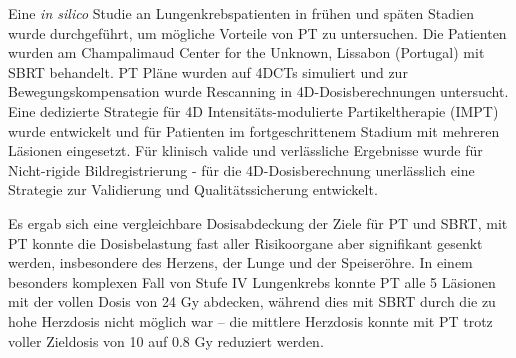 Eine \textit{in silico} Studie an Lungenkrebspatienten in fr\"{u}hen und sp\"{a}ten Stadien wurde durchgef\"{u}hrt, 
um m\"{o}gliche Vorteile von PT zu untersuchen. Die Patienten wurden am Champalimaud Center for the 
Unknown, Lissabon (Portugal) mit SBRT behandelt. PT Pl\"{a}ne wurden auf 4DCTs simuliert und zur 
Bewegungskompensation wurde Rescanning in 4D-Dosisberechnungen untersucht. Eine dedizierte Strategie 
f\"{u}r 4D Intensit\"{a}ts-modulierte Partikeltherapie (IMPT) wurde entwickelt und f\"{u}r Patienten im fortgeschrittenem 
Stadium mit mehreren L\"{a}sionen eingesetzt. F\"{u}r klinisch valide und verl\"{a}ssliche Ergebnisse wurde f\"{u}r Nicht-rigide
Bildregistrierung - f\"{u}r die 4D-Dosisberechnung unerl\"{a}sslich eine Strategie zur Validierung und Qualit\"{a}tssicherung entwickelt.

Es ergab sich eine vergleichbare Dosisabdeckung der Ziele f\"{u}r PT und SBRT, mit PT konnte die 
Dosisbelastung fast aller Risikoorgane aber signifikant gesenkt werden, insbesondere des Herzens, der Lunge und der Speiser\"{o}hre. 
In einem besonders komplexen Fall von Stufe IV Lungenkrebs konnte PT alle 5 L\"{a}sionen mit der vollen Dosis von 24 Gy abdecken, w\"{a}hrend dies mit SBRT durch die zu hohe 
Herzdosis nicht m\"{o}glich war – die mittlere Herzdosis konnte mit PT trotz voller Zieldosis von 10 auf 0.8 Gy reduziert werden.


